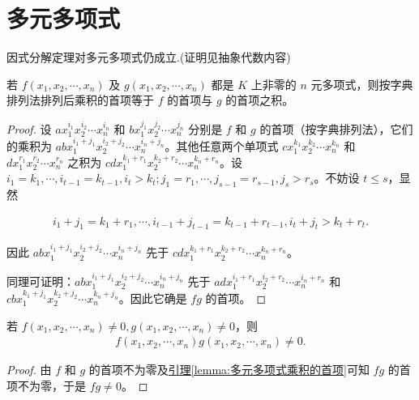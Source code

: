 \documentclass[../../main.tex]{subfiles}
\begin{document}
\section{多元多项式}

因式分解定理对多元多项式仍成立.(证明见抽象代数内容)

\begin{lemma}\label{lemma:多元多项式乘积的首项}
若 $f(x_1, x_2, \cdots, x_n)$ 及 $g(x_1, x_2, \cdots, x_n)$ 都是 $K$ 上非零的 $n$ 元多项式，则按字典排列法排列后乘积的首项等于 $f$ 的首项与 $g$ 的首项之积。
\end{lemma}
\begin{proof}
设 $ax_1^{i_1} x_2^{i_2} \cdots x_n^{i_n}$ 和 $bx_1^{j_1} x_2^{j_2} \cdots x_n^{j_n}$ 分别是 $f$ 和 $g$ 的首项（按字典排列法），它们的乘积为 $abx_1^{i_1 + j_1} x_2^{i_2 + j_2} \cdots x_n^{i_n + j_n}$。其他任意两个单项式 $cx_1^{k_1} x_2^{k_2} \cdots x_n^{k_n}$ 和 $dx_1^{r_1} x_2^{r_2} \cdots x_n^{r_n}$ 之积为 $cdx_1^{k_1 + r_1} x_2^{k_2 + r_2} \cdots x_n^{k_n + r_n}$。设 $i_1 = k_1, \cdots, i_{t-1} = k_{t-1}, i_t > k_t; j_1 = r_1, \cdots, j_{s-1} = r_{s-1}, j_s > r_s$。不妨设 $t \leq s$，显然

\begin{align*}
i_1 + j_1 = k_1 + r_1, \cdots, i_{t-1} + j_{t-1} = k_{t-1} + r_{t-1}, i_t + j_t > k_t + r_t.
\end{align*}

因此 $abx_1^{i_1 + j_1} x_2^{i_2 + j_2} \cdots x_n^{i_n + j_n}$ 先于 $cdx_1^{k_1 + r_1} x_2^{k_2 + r_2} \cdots x_n^{k_n + r_n}$。

同理可证明：$abx_1^{i_1 + j_1} x_2^{i_2 + j_2} \cdots x_n^{i_n + j_n}$ 先于 $adx_1^{i_1 + r_1} x_2^{i_2 + r_2} \cdots x_n^{i_n + r_n}$ 和 $cbx_1^{k_1 + j_1} x_2^{k_2 + j_2} \cdots x_n^{k_n + j_n}$。因此它确是 $fg$ 的首项。
\end{proof}

\begin{proposition}[多元多项式的整性]\label{proposition:多元多项式的整性}
若 $f(x_1, x_2, \cdots, x_n) \neq 0, g(x_1, x_2, \cdots, x_n) \neq 0$，则
\begin{align*}
f(x_1, x_2, \cdots, x_n)g(x_1, x_2, \cdots, x_n) \neq 0.
\end{align*}
\end{proposition}
\begin{proof}
由 $f$ 和 $g$ 的首项不为零及\hyperref[lemma:多元多项式乘积的首项]{引理\ref{lemma:多元多项式乘积的首项}}可知 $fg$ 的首项不为零，于是 $fg \neq 0$。
\end{proof}
\end{document}
